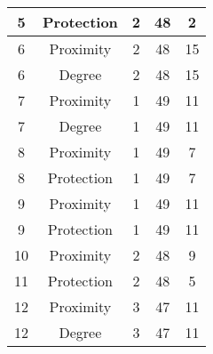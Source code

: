 \documentclass[results.tex]{subfiles}
\begin{document}
\begin{center}
\begin{tabular}{| c || c | c | c | c |}
            \hline
            5                       & Protection                   & 2                      & 48                      & 2                    \\
            \hline
            6                       & Proximity                    & 2                      & 48                      & 15                   \\
            \hline
            6                       & Degree                       & 2                      & 48                      & 15                   \\
            \hline
            7                       & Proximity                    & 1                      & 49                      & 11                   \\
            \hline
            7                       & Degree                       & 1                      & 49                      & 11                   \\
            \hline
            8                       & Proximity                    & 1                      & 49                      & 7                    \\
            \hline
            8                       & Protection                   & 1                      & 49                      & 7                    \\
            \hline
            9                       & Proximity                    & 1                      & 49                      & 11                   \\
            \hline
            9                       & Protection                   & 1                      & 49                      & 11                   \\
            \hline
            10                      & Proximity                    & 2                      & 48                      & 9                    \\
            \hline
            11                      & Protection                   & 2                      & 48                      & 5                    \\
            \hline
            12                      & Proximity                    & 3                      & 47                      & 11                   \\
            \hline
            12                      & Degree                       & 3                      & 47                      & 11                   \\

\end{tabular}
\end{center}
\end{document}
